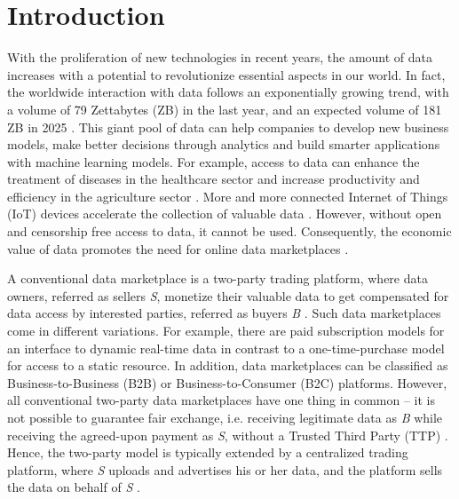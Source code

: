 \chapter{Introduction}
\label{cha:introduction}

With the proliferation of new technologies in recent years, the amount of data increases with a potential to revolutionize essential aspects in our world. In fact, the worldwide interaction with data follows an exponentially growing trend, with a volume of 79 Zettabytes (ZB) in the last year, and an expected volume of 181 ZB in 2025 \cite{statistaDataWorldWide}. This giant pool of data can help companies to develop new business models, make better decisions through analytics and build smarter applications with machine learning models. For example, access to data can enhance the treatment of diseases in the healthcare sector \cite{koutsosAgoraPrivacyAwareData,wangBigDataAnalytics2018,suBDTFBlockchainBasedData2020} and increase productivity and efficiency in the agriculture sector \cite{elijahOverviewInternetThings2018}. More and more connected Internet of Things (IoT) devices accelerate the collection of valuable data \cite{ozyilmazIDMoBIoTData2018,lawrenzBlockchainTechnologyApproach2019}. However, without open and censorship free access to data, it cannot be used. Consequently, the economic value of data promotes the need for online data marketplaces \cite{dagevilleSnowflakeElasticData2016,krishnamachariI3IoTMarketplace2018}.

A conventional data marketplace is a two-party trading platform, where data owners, referred as sellers \emph{S}, monetize their valuable data to get compensated for data access by interested parties, referred as buyers \emph{B} \cite{banerjeeBlockchainEnabledData2019}. Such data marketplaces come in different variations. For example, there are paid subscription models for an interface to dynamic real-time data in contrast to a one-time-purchase model for access to a static resource. In addition, data marketplaces can be classified as Business-to-Business (B2B) or Business-to-Consumer (B2C) platforms. %
However, all conventional two-party data marketplaces have one thing in common -- it is not possible to guarantee fair exchange, i.e. receiving legitimate data as \emph{B} while receiving the agreed-upon payment as \emph{S}, without a Trusted Third Party (TTP) \cite{banerjeeBlockchainEnabledData2019}. Hence, the two-party model is typically extended by a centralized trading platform, where \emph{S} uploads and advertises his or her data, and the platform sells the data on behalf of \emph{S} \cite{banerjeeBlockchainEnabledData2019,daiSDTESecureBlockchainBased2020,suBDTFBlockchainBasedData2020}.


